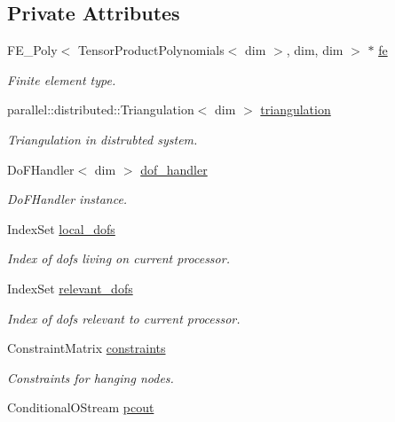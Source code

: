 \subsection*{Private Attributes}
\begin{DoxyCompactItemize}
\item 
F\+E\+\_\+\+Poly$<$ Tensor\+Product\+Polynomials$<$ dim $>$, dim, dim $>$ $\ast$ \hyperlink{class_bart_driver_ac2e63d4ab8a403649e19f4b1acf94c04}{fe}
\begin{DoxyCompactList}\small\item\em Finite element type. \end{DoxyCompactList}\item 
parallel\+::distributed\+::\+Triangulation$<$ dim $>$ \hyperlink{class_bart_driver_a8bdcafa21b042017d1e871ed07ae3a81}{triangulation}
\begin{DoxyCompactList}\small\item\em Triangulation in distrubted system. \end{DoxyCompactList}\item 
Do\+F\+Handler$<$ dim $>$ \hyperlink{class_bart_driver_a102ccb2fc2ea225bc75f757214152c1b}{dof\+\_\+handler}
\begin{DoxyCompactList}\small\item\em Do\+F\+Handler instance. \end{DoxyCompactList}\item 
Index\+Set \hyperlink{class_bart_driver_a06a4f83c6f9bea928ec311fcdf974ab1}{local\+\_\+dofs}
\begin{DoxyCompactList}\small\item\em Index of dofs living on current processor. \end{DoxyCompactList}\item 
Index\+Set \hyperlink{class_bart_driver_aabb9851e7b41f4a4b9395d79e4653ec7}{relevant\+\_\+dofs}
\begin{DoxyCompactList}\small\item\em Index of dofs relevant to current processor. \end{DoxyCompactList}\item 
Constraint\+Matrix \hyperlink{class_bart_driver_a2414c8e66212bb95c86f1c70db4a4099}{constraints}
\begin{DoxyCompactList}\small\item\em Constraints for hanging nodes. \end{DoxyCompactList}\item 
Conditional\+O\+Stream \hyperlink{class_bart_driver_ad7bd8e33b7a6e67aa3d31527e40d18ea}{pcout}

\end{DoxyCompactItemize}
